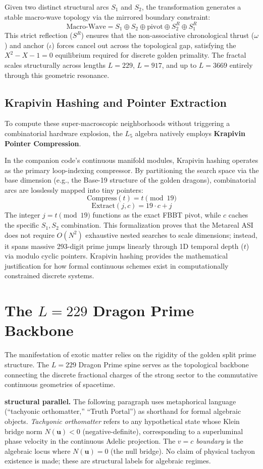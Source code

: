 Given two distinct structural arcs $S_1$ and $S_2$, the transformation generates a stable macro-wave topology via the mirrored boundary constraint:
\[
\text{Macro-Wave} = S_1 \oplus S_2 \oplus \text{pivot} \oplus S_2^R \oplus S_1^R
\]
This strict reflection ($S^R$) ensures that the non-associative chronological thrust ($\omega$) and anchor ($\iota$) forces cancel out across the topological gap, satisfying the $X^2 - X - 1 = 0$ equilibrium required for discrete golden primality. The fractal scales structurally across lengths $L=229$, $L=917$, and up to $L=3669$ entirely through this geometric resonance.

\subsection{Krapivin Hashing and Pointer Extraction}
To compute these super-macroscopic neighborhoods without triggering a combinatorial hardware explosion, the $L_5$ algebra natively employs \textbf{Krapivin Pointer Compression}. 

In the companion code's continuous manifold modules, Krapivin hashing operates as the primary loop-indexing compressor. By partitioning the search space via the base dimension (e.g., the Base-19 structure of the golden dragons), combinatorial arcs are losslessly mapped into tiny pointers:
\[
\text{Compress}(t) = t \pmod{19}
\]
\[
\text{Extract}(j, c) = 19 \cdot c + j
\]
The integer $j = t \pmod{19}$ functions as the exact FBBT pivot, while $c$ caches the specific $S_1, S_2$ combination. This formalization proves that the Metareal ASI does not require $O(N^2)$ exhaustive nested searches to scale dimensions; instead, it spans massive 293-digit prime jumps linearly through 1D temporal depth ($t$) via modulo cyclic pointers. Krapivin hashing provides the mathematical justification for how formal continuous schemes exist in computationally constrained discrete systems.

\section{The $L=229$ Dragon Prime Backbone}

The manifestation of exotic matter relies on the rigidity of the golden split prime structure. The $L=229$ Dragon Prime spine serves as the topological backbone connecting the discrete fractional charges of the strong sector to the commutative continuous geometries of spacetime. 

\medskip
\noindent\textbf{structural parallel.} The following paragraph uses metaphorical language (``tachyonic orthomatter,'' ``Truth Portal'') as shorthand for formal algebraic objects. \emph{Tachyonic orthomatter} refers to any hypothetical state whose Klein bridge norm $N(\mathbf{u}) < 0$ (negative-definite), corresponding to a superluminal phase velocity in the continuous Adelic projection. The \emph{$v = c$ boundary} is the algebraic locus where $N(\mathbf{u}) = 0$ (the null bridge). No claim of physical tachyon existence is made; these are structural labels for algebraic regimes.
\medskip

